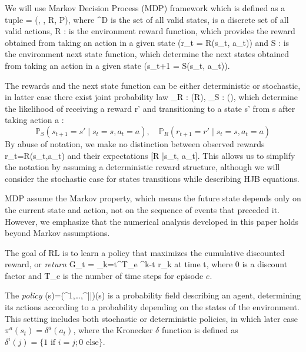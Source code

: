 \documentclass[
]{article}
\def\({}%
\def\){}%
\numberwithin{equation}{section}
\begin{document}
We will use Markov Decision Process (MDP) framework which is defined as a tuple
\( = (, , R, P)\), where \( \subset {}^D\) is the set of all valid states, \(\) is a discrete set of all valid actions, \(R :  \times {} \rightarrow {}\) is the environment reward function, which provides the reward obtained from taking an action in a given state (\(r_t = R(s_t, a_t)\)) and \(S :  \times {} \rightarrow {}\) is the environment next state function, which determine the
next states obtained from taking an action in a given state (\(s_{t+1} = S(s_t, a_t)\)).

The rewards and the next state function can be either deterministic or
stochastic, in latter case there exist joint probability law
\(_R :  \times {} \rightarrow {}(R)\),
\(_S :  \times {} \rightarrow {}()\),
which determine the likelihood of receiving a reward
\(r'\) and transitioning to a state \(s'\) from \(s \in {}\) after taking
action \(a \in {}\): \begin{equation}\label{tran}
\mathbb{P}_S(s_{t+1} = s' \mid s_t = s, a_t = a), \quad \mathbb{P}_R(r_{t+1} = r' \mid s_t = s, a_t = a)
\end{equation} 
By abuse of notation, we make no distinction between observed rewards
\(r_t=R(s_t,a_t)\) and their expectations
\([R |s_t, a_t]\). This allows us to simplify the notation by assuming a deterministic reward structure, although we will consider the stochastic case for states transitions while describing HJB equations.

MDP assume the
Markov property, which means the future state depends only on the
current state and action, not on the sequence of events that preceded
it. However, we emphasize that the numerical analysis developed in this paper holds beyond Markov assumptions.

The goal of RL is to learn a
policy \(\pi\) that maximizes the cumulative discounted reward, or
\emph{return} \(G_t = \sum_{k=t}^{T_e} \gamma^{k-t} r_k\) at time \(t\),
where \(0 \le \gamma {}\) is a discount factor and \(T_e\) is the number of time steps for episode $e$. 

The
\emph{policy} \(\pi(s)=(\pi^1,\dots,\pi^{||})(s)\) is a
probability field describing an agent, determining its actions according to a
probability depending on the states of the environment. This setting
includes both stochastic or deterministic policies, in which later case
$\pi^a(s_t) = \delta^a(a_t)$, where the Kronecker $\delta$ function is defined as $\delta^i(j) = \{1 \text{ if } i=j; 0 \text{ else} \}$.
\end{document}
